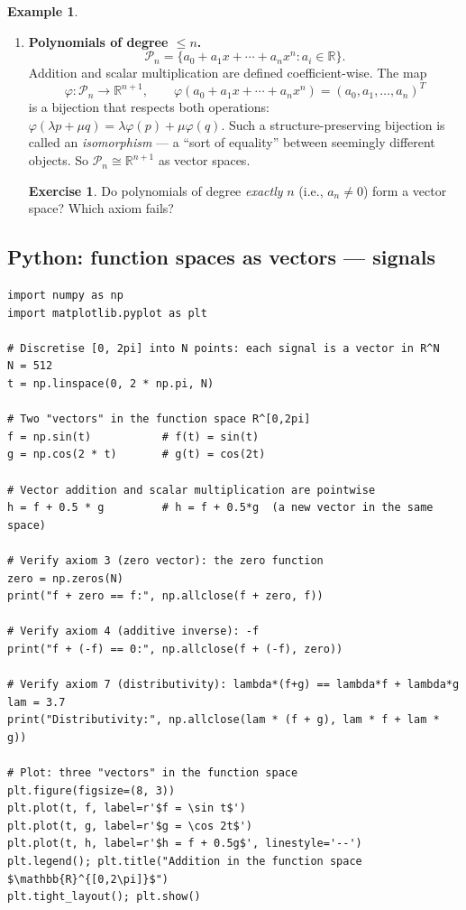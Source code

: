 \documentclass[11pt]{article}
\theoremstyle{definition}
\newtheorem{example}{Example}[section]
\newtheorem{exercise}{Exercise}[section]
\theoremstyle{plain}
\begin{document}
\begin{example}
\begin{enumerate}
    \item \textbf{Polynomials of degree $\le n$.}
      \[
        \mathcal{P}_n = \{a_0 + a_1 x + \cdots + a_n x^n : a_i\in\mathbb{R}\}.
      \]
      Addition and scalar multiplication are defined coefficient-wise.
      The map
      \[
        \varphi: \mathcal{P}_n \longrightarrow \mathbb{R}^{n+1}, \qquad
        \varphi(a_0 + a_1 x + \cdots + a_n x^n) = (a_0, a_1, \ldots, a_n)^T
      \]
      is a bijection that respects both operations:
      $\varphi(\lambda p + \mu q) = \lambda\varphi(p) + \mu\varphi(q)$.
      Such a structure-preserving bijection is called an \emph{isomorphism}
      --- a ``sort of equality'' between seemingly different objects.
      So $\mathcal{P}_n \cong \mathbb{R}^{n+1}$ as vector spaces.

      \begin{exercise}
        Do polynomials of degree \emph{exactly} $n$ (i.e., $a_n \ne 0$)
        form a vector space?  Which axiom fails?
      \end{exercise}
  \end{enumerate}
\end{example}

\subsection{Python: function spaces as vectors --- signals}
\begin{lstlisting}
import numpy as np
import matplotlib.pyplot as plt

# Discretise [0, 2pi] into N points: each signal is a vector in R^N
N = 512
t = np.linspace(0, 2 * np.pi, N)

# Two "vectors" in the function space R^[0,2pi]
f = np.sin(t)           # f(t) = sin(t)
g = np.cos(2 * t)       # g(t) = cos(2t)

# Vector addition and scalar multiplication are pointwise
h = f + 0.5 * g         # h = f + 0.5*g  (a new vector in the same space)

# Verify axiom 3 (zero vector): the zero function
zero = np.zeros(N)
print("f + zero == f:", np.allclose(f + zero, f))

# Verify axiom 4 (additive inverse): -f
print("f + (-f) == 0:", np.allclose(f + (-f), zero))

# Verify axiom 7 (distributivity): lambda*(f+g) == lambda*f + lambda*g
lam = 3.7
print("Distributivity:", np.allclose(lam * (f + g), lam * f + lam * g))

# Plot: three "vectors" in the function space
plt.figure(figsize=(8, 3))
plt.plot(t, f, label=r'$f = \sin t$')
plt.plot(t, g, label=r'$g = \cos 2t$')
plt.plot(t, h, label=r'$h = f + 0.5g$', linestyle='--')
plt.legend(); plt.title("Addition in the function space $\mathbb{R}^{[0,2\pi]}$")
plt.tight_layout(); plt.show()
\end{lstlisting}
\end{document}
